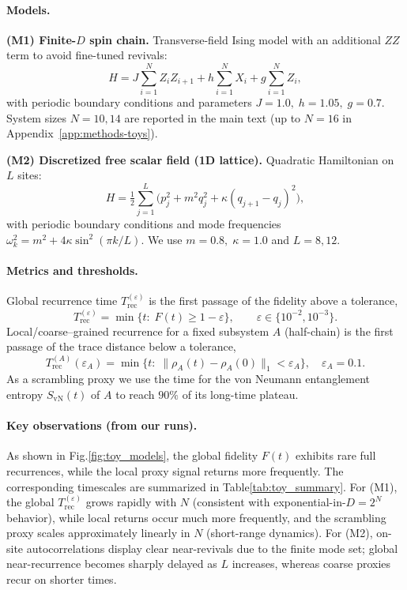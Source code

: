 \documentclass[12pt]{article}
\theoremstyle{remark}
\begin{document}
\paragraph{Models.}
\textbf{(M1) Finite-$D$ spin chain.}
Transverse-field Ising model with an additional \(ZZ\) term to avoid fine-tuned revivals:
\[
H = J\sum_{i=1}^{N} Z_i Z_{i+1} + h\sum_{i=1}^{N} X_i + g\sum_{i=1}^{N} Z_i,
\]
with periodic boundary conditions and parameters \(J=1.0,\; h=1.05,\; g=0.7\).
System sizes \(N=10,14\) are reported in the main text (up to \(N=16\) in Appendix~\ref{app:methods-toys}).

\noindent
\textbf{(M2) Discretized free scalar field (1D lattice).}
Quadratic Hamiltonian on \(L\) sites:
\[
H=\tfrac12\sum_{j=1}^{L}\!\big(p_j^2+m^2 q_j^2+\kappa (q_{j+1}-q_j)^2\big),
\]
with periodic boundary conditions and mode frequencies
\(\omega_k^2=m^2+4\kappa\sin^2(\pi k/L)\).
We use \(m=0.8,\;\kappa=1.0\) and \(L=8,12\).

\paragraph{Metrics and thresholds.}
Global recurrence time \(T_{\mathrm{rec}}^{(\varepsilon)}\) is the first passage of the fidelity above a tolerance,
\[
T_{\mathrm{rec}}^{(\varepsilon)}=\min\{t:\; F(t)\ge 1-\varepsilon\},\qquad \varepsilon\in\{10^{-2},10^{-3}\}.
\]
Local/coarse–grained recurrence for a fixed subsystem \(A\) (half-chain) is the first passage of the trace distance below a tolerance,
\[
T^{(A)}_{\mathrm{rec}}(\varepsilon_A)=\min\{t:\;\|\rho_A(t)-\rho_A(0)\|_1<\varepsilon_A\},\quad \varepsilon_A=0.1.
\]
As a scrambling proxy we use the time for the von Neumann entanglement entropy \(S_{\mathrm{vN}}(t)\) of \(A\) to reach \(90\%\) of its long-time plateau.

\paragraph{Key observations (from our runs).}
As shown in Fig.\ref{fig:toy_models}, the global fidelity $F(t)$ exhibits rare full recurrences, while the local proxy signal returns more frequently. The corresponding timescales are summarized in Table\ref{tab:toy_summary}.
For (M1), the global \(T_{\mathrm{rec}}^{(\varepsilon)}\) grows rapidly with \(N\) (consistent with exponential-in-\(D=2^N\) behavior),
while local returns occur much more frequently, and the scrambling proxy scales approximately linearly in \(N\) (short-range dynamics).
For (M2), on-site autocorrelations display clear near-revivals due to the finite mode set; global near-recurrence becomes sharply delayed as \(L\) increases, whereas coarse proxies recur on shorter times.
\end{document}
